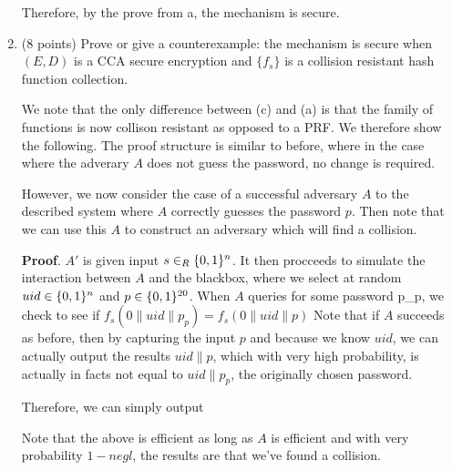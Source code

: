 \documentclass{article}
\begin{document}
\begin{enumerate}[,label=\alph*.]
Therefore, by the prove from a, the mechanism is secure.%

\item{}
(8 points) Prove or give a counterexample: the mechanism is secure when $(E,D)$ is a CCA secure encryption and $\{ f_s \}$ is a collision resistant hash function collection.%

We note that the only difference between (c) and (a) is that the family of functions is now collison
resistant as opposed to a PRF. We therefore show the following. The proof structure is similar to before,
where in the case where the adverary $A$ does not guess the password, no change is required.%

However, we now consider the case of a successful adversary $A$ to the described system where $A$
correctly guesses the password $p$. Then note that we can use this $A$ to construct an adversary
which will find a collision.%

\begin{mdbmarginx}{1ex}{0pt}{1ex}{0pt}%
\noindent{}\textbf{Proof}.   $A'$ is given input $s \in_R \{0,1\}^n$. It then procceeds to simulate the interaction between $A$
 and the blackbox, where we select at random $uid \in \{0,1\}^n$ and $p \in \{0,1\}^{20}$. When $A$
 queries for some password p\_p, we check to see if $f_s(0 \| uid \| p_p) = f_s(0 \| uid \| p)$ 
 Note that if $A$ succeeds as before, then by  capturing the input $p$ and because we know
 $uid$, we can actually output the results $uid \| p$, which with very high probability, 
 is actually in facts not equal to $uid \| p_p$, the originally chosen password.
 
 Therefore, we can simply output
 
 Note that the above is efficient as long as $A$ is efficient and with very probability $1 - negl$, the
 results are that we've found a collision.%
\end{mdbmarginx}%


\end{enumerate}
\end{document}

